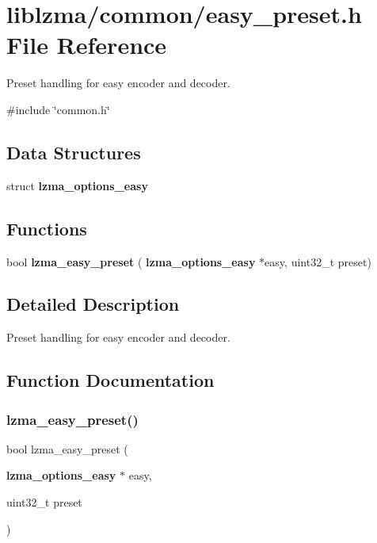 \section{liblzma/common/easy\+\_\+preset.h File Reference}
\label{easy__preset_8h}


Preset handling for easy encoder and decoder.  


{\ttfamily \#include \char`\"{}common.\+h\char`\"{}}\newline
\subsection*{Data Structures}
\begin{DoxyCompactItemize}
\item 
struct \textbf{ lzma\+\_\+options\+\_\+easy}
\end{DoxyCompactItemize}
\subsection*{Functions}
\begin{DoxyCompactItemize}
\item 
bool \textbf{ lzma\+\_\+easy\+\_\+preset} (\textbf{ lzma\+\_\+options\+\_\+easy} $\ast$easy, uint32\+\_\+t preset)
\end{DoxyCompactItemize}


\subsection{Detailed Description}
Preset handling for easy encoder and decoder. 



\subsection{Function Documentation}
\mbox{\label{easy__preset_8h_ae2fd3feb0515d5f984c473a7b815b02b}} 
\subsubsection{lzma\+\_\+easy\+\_\+preset()}
{\footnotesize\ttfamily bool lzma\+\_\+easy\+\_\+preset (\begin{DoxyParamCaption}\item[{\textbf{ lzma\+\_\+options\+\_\+easy} $\ast$}]{easy,  }\item[{uint32\+\_\+t}]{preset }\end{DoxyParamCaption})}

